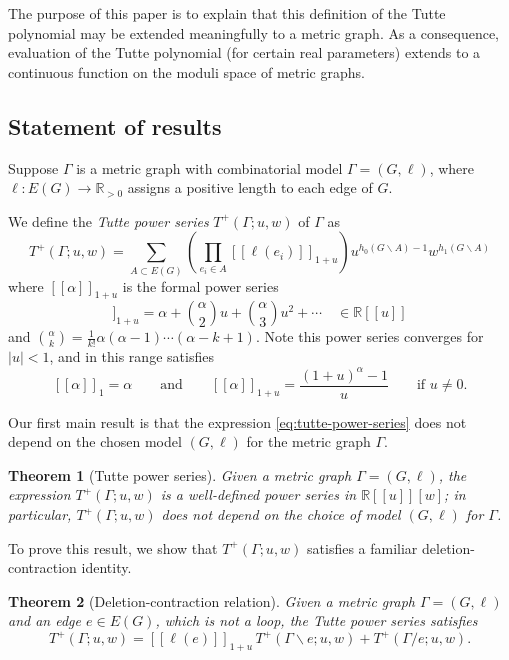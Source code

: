 \documentclass{amsart}
\newtheorem{thm}{Theorem}
\theoremstyle{definition}
\newcommand{\RR}{\mathbb{R}}
\newcommand{\RRpos}{\RR_{>0}}
\newcommand{\fanalog}[2]{[\![#2]\!]_{#1}}
\begin{document}
The purpose of this paper is to explain that this definition of the Tutte polynomial may be extended meaningfully to a metric graph.
As a consequence, evaluation of the Tutte polynomial (for certain real parameters) extends to a continuous function on the moduli space of metric graphs.

\subsection{Statement of results}
Suppose $\Gamma$ is a metric graph with combinatorial model $\Gamma = (G,\ell)$,
where $\ell : E(G) \to \RRpos$ assigns a positive length to each edge of $G$.

We define the {\em Tutte power series}
$T^+(\Gamma; u,w)$ %
of $\Gamma$ as
\begin{equation}
\label{eq:tutte-power-series}
	T^+(\Gamma; u,w) = \sum_{A \subset E(G)} \left( \prod_{e_i \in A} \fanalog{1 + u}{\ell(e_i)} \right)
	u^{h_0(G\backslash A) - 1}w^{h_1(G\backslash A)} 
\end{equation}
where $\fanalog{1 + u}{\alpha}$ is the formal power series  
\begin{equation}
	\fanalog{1 + u}{\alpha} = \alpha + \binom{\alpha}{2} u + \binom{\alpha}{3} u^2 + \cdots
	\quad \in \RR[[u]]
\end{equation}
and
$\displaystyle
\binom{\alpha}{k} = \frac1{k!}\alpha(\alpha - 1) \cdots (\alpha - k + 1)$.
Note this power series converges for $|u| < 1$, and in this range satisfies
\[ 
	\fanalog{1}{\alpha} = \alpha
	\qquad\text{and}\qquad
	\fanalog{1 + u}{\alpha} = \frac{(1+u)^\alpha - 1}{u}
	\qquad \text{if } u \neq 0.
\]

Our first main result is that the expression \eqref{eq:tutte-power-series} does not depend on the chosen model $(G,\ell)$ for the metric graph $\Gamma$.
\begin{thm}[Tutte power series]
\label{thm:intro-tutte-series}
Given a metric graph $\Gamma = (G,\ell)$,
the expression $T^+(\Gamma; u,w)$
is a well-defined power series in
$\RR[[u]][w]$;
in particular,
$T^+(\Gamma; u,w)$ does not depend on the choice of model $(G,\ell)$ for $\Gamma$.
\end{thm}

To prove this result, we show that $T^+(\Gamma; u, w)$ satisfies a familiar deletion-contraction identity.
\begin{thm}[Deletion-contraction relation]
\label{thm:deletion-contraction}
Given a metric graph $\Gamma = (G,\ell)$ and an edge $e \in E(G)$,
which is not a loop,
the Tutte power series satisfies
\begin{equation}
	T^+(\Gamma; u,w) = \fanalog{1 + u}{\ell(e)} \, T^+(\Gamma \backslash e; u,w) + T^+(\Gamma / e; u,w).
\end{equation}
\end{thm}
\end{document}

